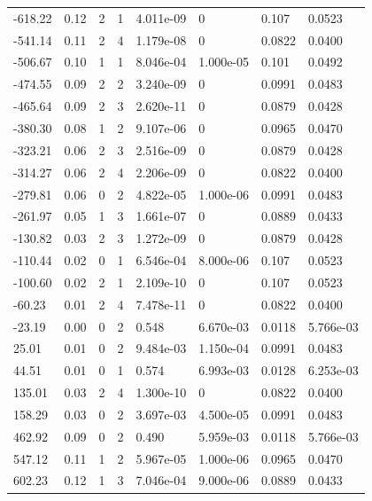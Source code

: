 \documentclass[preview]{standalone}
\begin{document}
{{\begin{tabular}{L{1.2cm}C{1.2cm} C{0.3cm}C{0.5cm} C{1.4cm}C{1.4cm} C{1.4cm}C{1.4cm}}
  -618.22  &  0.12  & 2     &  1 &  4.011e-09  & 0  & 0.107 &  0.0523   \\ 
  -541.14  &  0.11  & 2     &  4 &  1.179e-08  & 0  & 0.0822 &  0.0400   \\ 
  -506.67  &  0.10  & 1     &  1 &  8.046e-04  & 1.000e-05  & 0.101 &  0.0492   \\ 
  -474.55  &  0.09  & 2     &  2 &  3.240e-09  & 0  & 0.0991 &  0.0483   \\ 
  -465.64  &  0.09  & 2     &  3 &  2.620e-11  & 0  & 0.0879 &  0.0428   \\ 
  -380.30  &  0.08  & 1     &  2 &  9.107e-06  & 0  & 0.0965 &  0.0470   \\ 
  -323.21  &  0.06  & 2     &  3 &  2.516e-09  & 0  & 0.0879 &  0.0428   \\ 
  -314.27  &  0.06  & 2     &  4 &  2.206e-09  & 0  & 0.0822 &  0.0400   \\ 
  -279.81  &  0.06  & 0     &  2 &  4.822e-05  & 1.000e-06  & 0.0991 &  0.0483   \\ 
  -261.97  &  0.05  & 1     &  3 &  1.661e-07  & 0  & 0.0889 &  0.0433   \\ 
  -130.82  &  0.03  & 2     &  3 &  1.272e-09  & 0  & 0.0879 &  0.0428   \\ 
  -110.44  &  0.02  & 0     &  1 &  6.546e-04  & 8.000e-06  & 0.107 &  0.0523   \\ 
  -100.60  &  0.02  & 2     &  1 &  2.109e-10  & 0  & 0.107 &  0.0523   \\ 
  -60.23  &  0.01  & 2     &  4 &  7.478e-11  & 0  & 0.0822 &  0.0400   \\ 
  -23.19  &  0.00  & 0     &  2 &  0.548  & 6.670e-03  & 0.0118 &  5.766e-03   \\ 
  25.01  &  0.01  & 0     &  2 &  9.484e-03  & 1.150e-04  & 0.0991 &  0.0483   \\ 
  44.51  &  0.01  & 0     &  1 &  0.574  & 6.993e-03  & 0.0128 &  6.253e-03   \\ 
  135.01  &  0.03  & 2     &  4 &  1.300e-10  & 0  & 0.0822 &  0.0400   \\ 
  158.29  &  0.03  & 0     &  2 &  3.697e-03  & 4.500e-05  & 0.0991 &  0.0483   \\ 
  462.92  &  0.09  & 0     &  2 &  0.490  & 5.959e-03  & 0.0118 &  5.766e-03   \\ 
  547.12  &  0.11  & 1     &  2 &  5.967e-05  & 1.000e-06  & 0.0965 &  0.0470   \\ 
  602.23  &  0.12  & 1     &  3 &  7.046e-04  & 9.000e-06  & 0.0889 &  0.0433   \\ 

\end{tabular}}}
\end{document}
